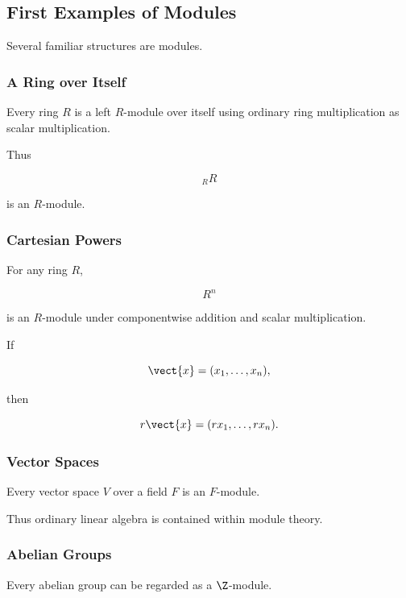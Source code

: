 \subsection{First Examples of Modules}
\label{subsec:first-module-examples}

Several familiar structures are modules.

\subsubsection{A Ring over Itself}

Every ring \(R\) is a left \(R\)-module over itself using ordinary ring
multiplication as scalar multiplication.

Thus

\[ {}_RR \]

is an \(R\)-module.

\subsubsection{Cartesian Powers}

For any ring \(R\),

\[ R^n \]

is an \(R\)-module under componentwise addition and scalar multiplication.

If

\[ \vect{x}=(x_1,\ldots,x_n), \]

then

\[ r\vect{x}=(rx_1,\ldots,rx_n). \]

\subsubsection{Vector Spaces}

Every vector space \(V\) over a field \(F\) is an \(F\)-module.

Thus ordinary linear algebra is contained within module theory.

\subsubsection{Abelian Groups}

Every abelian group can be regarded as a \(\Z\)-module.

